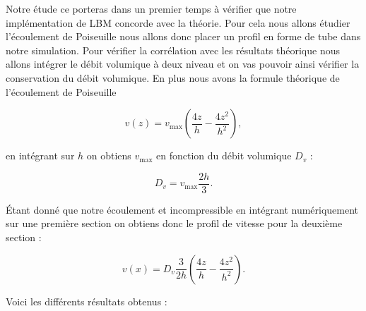 Notre étude ce porteras dans un premier temps à vérifier que notre implémentation de LBM concorde avec la théorie.
Pour cela nous allons étudier l'écoulement de Poiseuille nous allons donc placer un profil en forme de tube dans notre simulation. Pour vérifier la corrélation avec les résultats théorique nous allons intégrer le débit volumique à deux
niveau et on vas pouvoir ainsi vérifier la conservation du débit volumique.
En plus nous avons la formule théorique de l'écoulement de Poiseuille 

\begin{equation}
  v(z) = v_\text{max} \left(\frac{4z}{h} - \frac{4z^2}{h^2}\right),
\end{equation}

en intégrant sur $h$ on obtiens $v_\text{max}$ en fonction du débit volumique $D_v$ : 

\begin{equation}
  D_v = v_\text{max} \frac{2h}{3}.
\end{equation}

Étant donné que notre écoulement et incompressible en intégrant numériquement sur une première section on obtiens donc 
le profil de vitesse pour la deuxième section :

\begin{equation}
  v(x) = D_v \frac{3}{2h} \left( \frac{4z}{h} - \frac{4z^2}{h^2} \right).
\end{equation}

Voici les différents résultats obtenus :

